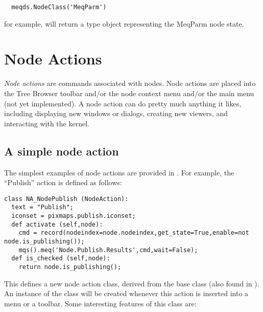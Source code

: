 \documentclass[12pt,twoside]{book}
\begin{document}
\begin{verbatim}  
  meqds.NodeClass('MeqParm')
\end{verbatim}

  for example, will return a type object representing the MeqParm node state.
  
\section{Node Actions}

  {\em Node actions} are commands associated with nodes. Node actions are placed
  into the Tree Browser toolbar and/or the node context menu and/or the main
  menu (not yet implemented). A node action can do pretty much anything it
  likes, including displaying new windows or dialogs, creating new viewers, and
  interacting with the kernel. 

\subsection{A simple node action}

  The simplest examples of node actions are provided in .
  For example, the ``Publish'' action is defined as follows:
  
\begin{verbatim}  
class NA_NodePublish (NodeAction):
  text = "Publish";
  iconset = pixmaps.publish.iconset;
  def activate (self,node):
    cmd = record(nodeindex=node.nodeindex,get_state=True,enable=not node.is_publishing());
    mqs().meq('Node.Publish.Results',cmd,wait=False);
  def is_checked (self,node):
    return node.is_publishing();
\end{verbatim}

  This defines a new node action class, derived from the  base
  class (also found in ). An instance of the class will
  be created whenever this action is inserted into a menu or a toolbar. Some
  interesting features of this class are:
  
\end{document}
